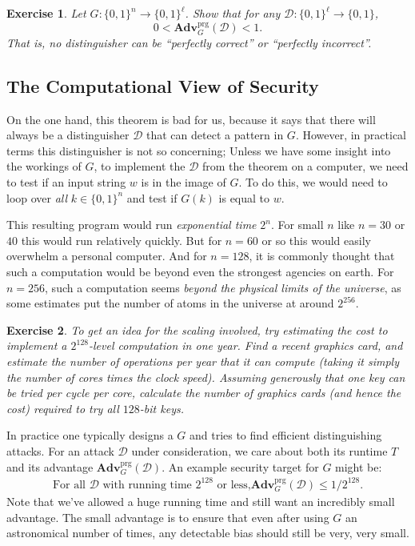 \documentclass[11pt]{article}
\newtheorem{exercise}{Exercise}
\newcommand{\calD}{\mathcal{D}}
\newcommand{\Adv}{\mathbf{Adv}}
\newcommand{\AdvPRG}[2]{\Adv^{\mathrm{prg}}_{#1}({#2})}
\newcommand{\bits}{\{0,1\}}
\begin{document}
\begin{exercise}
    Let $G:\bits^n\to\bits^\ell$. Show that for \emph{any}
    $\calD:\bits^\ell\to\bits$,
    \[
        0 < \AdvPRG{G}{\calD} < 1.
    \]
    That is, no distinguisher can be ``perfectly correct'' or ``perfectly
    incorrect''.
\end{exercise}

\subsection{The Computational View of Security}

On the one hand, this theorem is bad for us, because it says that there will
always be a distinguisher $\calD$ that can detect a pattern in $G$.  However,
in practical terms this distinguisher is not so concerning; Unless we have some
insight into the workings of $G$, to implement the $\calD$ from the theorem on
a computer, we need to test if an input string $w$ is in the image of $G$. To
do this, we would need to loop over \emph{all} $k\in\bits^n$ and test if $G(k)$
is equal to $w$. 

This resulting program would run \emph{exponential time} $2^n$.  For small $n$
like $n=30$ or $40$ this would run relatively quickly.  But for $n=60$ or so
this would easily overwhelm a personal computer. And for $n=128$, it is
commonly thought that such a computation would be beyond even the strongest
agencies on earth.  For $n=256$, such a computation seems \emph{beyond the
physical limits of the universe}, as some estimates put the number of atoms in
the universe at around $2^{256}$.

\begin{exercise}
    To get an idea for the scaling involved, try estimating the cost to
    implement a $2^{128}$-level computation in one year. Find a 
    recent graphics card, and estimate the number of operations
    per year that it can compute (taking it simply the number of cores
    times the clock speed). Assuming generously that one key can be tried
    per cycle per core, calculate the number of graphics cards (and hence
    the cost) required to try all $128$-bit keys.
\end{exercise}

In practice one typically designs a $G$ and tries to find efficient
distinguishing attacks. For an attack $\calD$ under consideration, we
care about both its runtime $T$ and its advantage $\AdvPRG{G}{\calD}$.
An example security target for $G$ might be:
\begin{align}\label{eq:bound}
    \text{For all $\calD$ with running time $2^{128}$ or less,
$\AdvPRG{G}{\calD}\leq 1/2^{128}$.}
\end{align}
Note that we've allowed a huge running time and still want an incredibly small
advantage. The small advantage is to ensure that even after using $G$ an
astronomical number of times, any detectable bias should still be very, very
small.
\end{document}
